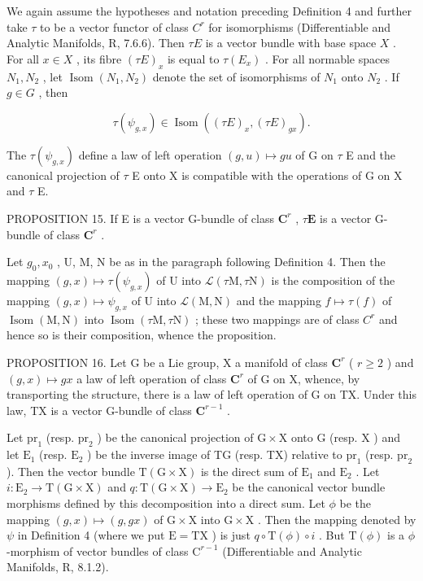 We again assume the hypotheses and notation preceding Definition 4 and further take \(\tau\) to be a vector functor of class \(C^r\) for isomorphisms (Differentiable and Analytic Manifolds, R, 7.6.6). Then \(\tau E\) is a vector bundle with base space \(X\) . For all \(x \in X\) , its fibre \((\tau E)_x\) is equal to \(\tau (E_x)\) . For all normable spaces \(N_1, N_2\) , let \(\operatorname{Isom}(N_1, N_2)\) denote the set of isomorphisms of \(N_1\) onto \(N_2\) . If \(g \in G\) , then

\[
\tau (\psi_ {g, x}) \in \operatorname{Isom} ((\tau E) _ {x}, (\tau E) _ {g x}).
\]

The \(\tau(\psi_{g,x})\) define a law of left operation \((g,u)\mapsto gu\) of G on \(\tau\) E and the canonical projection of \(\tau\) E onto X is compatible with the operations of G on X and \(\tau\) E.

PROPOSITION 15. If E is a vector G-bundle of class \(\mathbf{C}^r\) , \(\tau \mathbf{E}\) is a vector G-bundle of class \(\mathbf{C}^r\) .

Let \(g_0, x_0\) , U, M, N be as in the paragraph following Definition 4. Then the mapping \((g, x) \mapsto \tau(\psi_{g,x})\) of U into \(\mathcal{L}(\tau\mathrm{M}, \tau\mathrm{N})\) is the composition of the mapping \((g, x) \mapsto \psi_{g,x}\) of U into \(\mathcal{L}(\mathrm{M}, \mathrm{N})\) and the mapping \(f \mapsto \tau(f)\) of \(\operatorname{Isom}(\mathrm{M}, \mathrm{N})\) into \(\operatorname{Isom}(\tau\mathrm{M}, \tau\mathrm{N})\) ; these two mappings are of class \(C^r\) and hence so is their composition, whence the proposition.

PROPOSITION 16. Let G be a Lie group, X a manifold of class \(\mathbf{C}^r\) ( \(r \geqslant 2\) ) and \((g, x) \mapsto gx\) a law of left operation of class \(\mathbf{C}^r\) of G on X, whence, by transporting the structure, there is a law of left operation of G on TX. Under this law, TX is a vector G-bundle of class \(\mathbf{C}^{r-1}\) .

Let \(\mathrm{pr}_1\) (resp. \(\mathrm{pr}_2\) ) be the canonical projection of \(\mathrm{G} \times \mathrm{X}\) onto \(\mathrm{G}\) (resp. \(\mathrm{X}\) ) and let \(\mathrm{E}_1\) (resp. \(\mathrm{E}_2\) ) be the inverse image of TG (resp. TX) relative to \(\mathrm{pr}_1\) (resp. \(\mathrm{pr}_2\) ). Then the vector bundle \(\mathrm{T}(\mathrm{G} \times \mathrm{X})\) is the direct sum of \(\mathrm{E}_1\) and \(\mathrm{E}_2\) . Let \(i: \mathrm{E}_2 \to \mathrm{T}(\mathrm{G} \times \mathrm{X})\) and \(q: \mathrm{T}(\mathrm{G} \times \mathrm{X}) \to \mathrm{E}_2\) be the canonical vector bundle morphisms defined by this decomposition into a direct sum. Let \(\phi\) be the mapping \((g, x) \mapsto (g, gx)\) of \(\mathrm{G} \times \mathrm{X}\) into \(\mathrm{G} \times \mathrm{X}\) . Then the mapping denoted by \(\psi\) in Definition 4 (where we put \(\mathrm{E} = \mathrm{TX}\) ) is just \(q \circ \mathrm{T}(\phi) \circ i\) . But \(\mathrm{T}(\phi)\) is a \(\phi\) -morphism of vector bundles of class \(\mathrm{C}^{r-1}\) (Differentiable and Analytic Manifolds, R, 8.1.2).

